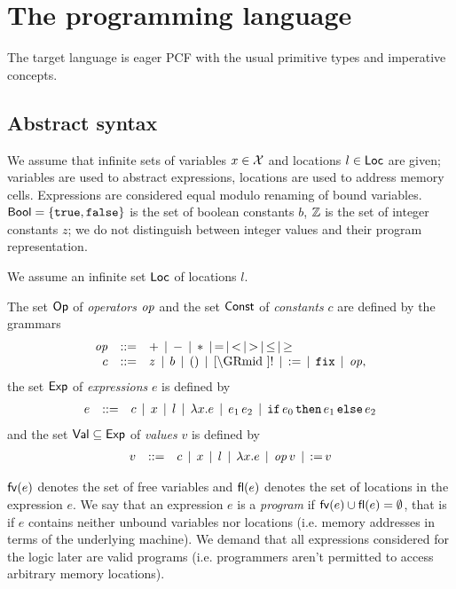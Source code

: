 \documentclass[12pt,a4paper]{report}
\begin{document}

\chapter{The programming language}

The target language is eager PCF with the usual primitive types and imperative concepts.



\section{Abstract syntax}

We assume that infinite sets of variables $x \in \mathcal{X}$ and locations $l \in \mathsf{Loc}$ are given;
variables are used to abstract expressions, locations are used to address memory cells.
Expressions are considered equal modulo renaming of bound variables.
$\mathsf{Bool}=\{\mathtt{true},\mathtt{false}\}$ is the set of boolean constants $b$, $\mathbb Z$ is the set of integer
constants $z$; we do not distinguish between integer values and their program representation.

We assume an infinite set $\mathsf{Loc}$ of locations $l$.

\begin{definition}[Expressions]
  The set $\mathsf{Op}$ of {\em operators} $\mathit{op}$ and the set $\mathsf{Const}$ of {\em constants} $c$
  are defined by the grammars
  \[\GRbeg
    \op \GRis + \GRmid - \GRmid * \GRmid = \GRmid < \GRmid > \GRmid \le \GRmid \ge \\
    c \GRis z \GRmid b \GRmid \unit \GRmid \cref \GRmid !
             \GRmid \assign \GRmid \fix \GRmid \op,
  \GRend\]
  the set $\mathsf{Exp}$ of {\em expressions} $e$ is defined by
  \[\begin{array}{rrlll}
    e & ::= & c \,\mid\, x \,\mid\, l \,\mid\, \lambda x.e \,\mid\, e_1\,e_2
           \,\mid\, \mathtt{if}\,e_0\,\mathtt{then}\,e_1\,\mathtt{else}\,e_2
  \end{array}\]
  and the set $\mathsf{Val} \subseteq \mathsf{Exp}$ of {\em values} $v$ is defined by
  \[\begin{array}{rrlll}
    v & ::= & c \,\mid\, x \,\mid\, l \,\mid\, \lambda x.e \,\mid\, \mathit{op}\,v \,\mid\, \mathtt{:=}\,v
  \end{array}\]
\end{definition}

$\mathsf{fv}(e)$ denotes the set of free variables and $\mathsf{fl}(e)$ denotes the set of locations in the
expression $e$. We say that an expression $e$ is a {\em program} if $\mathsf{fv}(e)\cup\mathsf{fl}(e)=\emptyset$,
that is if $e$ contains neither unbound variables nor
locations (i.e. memory addresses in terms of the underlying machine). We demand that all expressions
considered for the logic later are valid programs (i.e. programmers aren't permitted to access
arbitrary memory locations).
\end{document}
